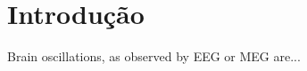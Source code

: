\section{Introdução}
Brain oscillations, as observed by EEG or MEG are... \cite{Medendorp2008} \cite{Davis2012} \cite{VanWijk2012}
